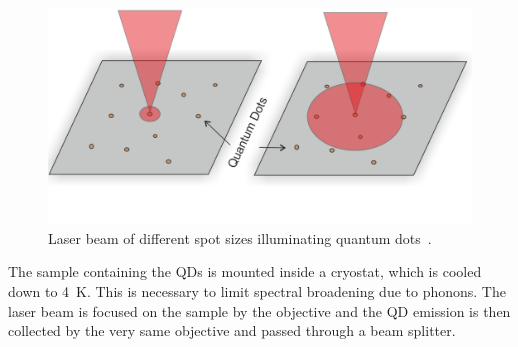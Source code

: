 \begin{figure}[H]
	\centering
	\includegraphics[width=0.7\linewidth]{figures/setup/micro-pl}
	\caption{Laser beam of different spot sizes illuminating quantum dots~\cite{reindl_characterisation_2014}.}
	\label{fig:micro-pl}
\end{figure}

The sample containing the \acp{QD} is mounted inside a cryostat, which is cooled down to \SI{4}{\kelvin}.
This is necessary to limit spectral broadening due to phonons.
The laser beam is focused on the sample by the objective and the \ac{QD} emission is then collected by the very same objective and passed through a beam splitter.
